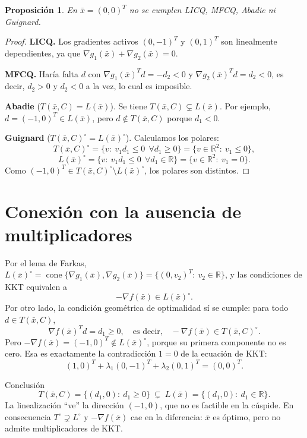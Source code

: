 \documentclass[11pt]{article}
\newtheorem{proposicion}{Proposición}
\begin{document}
\begin{proposicion}
En $\bar x=(0,0)^T$ no se cumplen LICQ, MFCQ, Abadie ni Guignard.
\end{proposicion}

\begin{proof}
\textbf{LICQ.} Los gradientes activos $(0,-1)^T$ y $(0,1)^T$ son linealmente dependientes, ya que $\nabla g_1(\bar x)+\nabla g_2(\bar x)=0$.

\textbf{MFCQ.} Haría falta $d$ con $\nabla g_1(\bar x)^Td=-d_2<0$ y $\nabla g_2(\bar x)^Td=d_2<0$, es decir, $d_2>0$ y $d_2<0$ a la vez, lo cual es imposible.

\textbf{Abadie} ($T(\bar x,C)=L(\bar x)$). Se tiene $T(\bar x,C)\subsetneq L(\bar x)$. Por ejemplo, $d=(-1,0)^T\in L(\bar x)$, pero $d\notin T(\bar x,C)$ porque $d_1<0$.

\textbf{Guignard} ($T(\bar x,C)^\circ=L(\bar x)^\circ$). Calculamos los polares:
\[
T(\bar x,C)^\circ=\{v:\ v_1d_1\le 0\ \ \forall d_1\ge 0\}=\{v\in\mathbb{R}^2:\ v_1\le 0\},
\]
\[
L(\bar x)^\circ=\{v:\ v_1d_1\le 0\ \ \forall d_1\in\mathbb{R}\}=\{v\in\mathbb{R}^2:\ v_1=0\}.
\]
Como $(-1,0)^T\in T(\bar x,C)^\circ\setminus L(\bar x)^\circ$, los polares son distintos.
\end{proof}

\section{Conexión con la ausencia de multiplicadores}

Por el lema de Farkas, $L(\bar x)^\circ=\operatorname{cone}\{\nabla g_1(\bar x),\nabla g_2(\bar x)\}=\{(0,v_2)^T:\ v_2\in\mathbb{R}\}$, y las condiciones de KKT equivalen a
\[
-\nabla f(\bar x)\in L(\bar x)^\circ .
\]
Por otro lado, la condición geométrica de optimalidad sí se cumple: para todo $d\in T(\bar x,C)$,
\[
\nabla f(\bar x)^Td=d_1\ge 0,
\quad\text{es decir,}\quad
-\nabla f(\bar x)\in T(\bar x,C)^\circ .
\]
Pero $-\nabla f(\bar x)=(-1,0)^T\notin L(\bar x)^\circ$, porque su primera componente no es cero. Esa es exactamente la contradicción $1=0$ de la ecuación de KKT:
\[
(1,0)^T+\lambda_1(0,-1)^T+\lambda_2(0,1)^T=(0,0)^T .
\]

\begin{obsbox}{Conclusión}
\[
T(\bar x,C)=\{(d_1,0):\ d_1\ge 0\}\ \subsetneq\ L(\bar x)=\{(d_1,0):\ d_1\in\mathbb{R}\}.
\]
La linealización ``ve'' la dirección $(-1,0)$, que no es factible en la cúspide. En consecuencia $T^\circ\supsetneq L^\circ$ y $-\nabla f(\bar x)$ cae en la diferencia: $\bar x$ es óptimo, pero no admite multiplicadores de KKT.
\end{obsbox}
\end{document}
